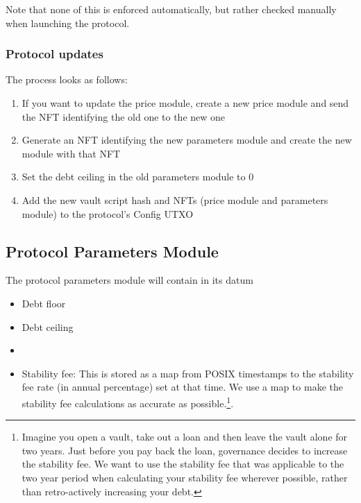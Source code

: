 \documentclass{article} %
\begin{document}
Note that none of this is enforced automatically, but rather checked manually
when launching the protocol.

\subsubsection*{Protocol updates}

The process looks as follows:
\begin{enumerate}
  \item If you want to update the price module, create a new price module and
    send the NFT identifying the old one to the new one
  \item Generate an NFT identifying the new parameters module and create the new
    module with that NFT
  \item Set the debt ceiling in the old parameters module to $0$
  \item Add the new vault script hash and NFTs (price module and parameters
    module) to the protocol's Config UTXO
\end{enumerate}


\subsection{Protocol Parameters Module}

The protocol parameters module will contain in its datum
\begin{itemize}
  \item Debt floor
  \item Debt ceiling
  \item {}
  \item Stability fee: This is stored as a map from POSIX timestamps to the
    stability fee rate (in annual percentage) set at that time. We use a map to
    make the stability fee calculations as accurate as possible.\footnote{
      Imagine you open a vault, take out a loan and then leave the vault alone
      for two years. Just before you pay back the loan, governance decides to
      increase the stability fee. We want to use the stability fee that was
      applicable to the two year period when calculating your stability fee
      wherever possible, rather than retro-actively increasing your debt.
    }. \\
\end{itemize}
\end{document}
